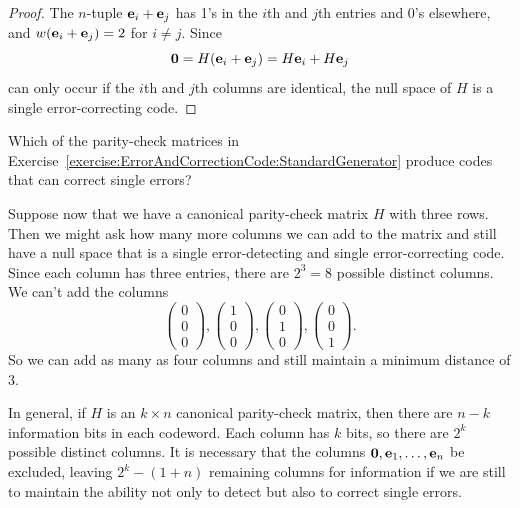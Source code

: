  
\begin{proof}
The $n$-tuple ${\bold e}_{i} +{\bold e}_{j}$ has 1's in the $i$th and
$j$th entries and 0's elsewhere, and $w( {\bold e}_{i} +{\bold
e}_{j}) = 2$ for $i \neq j$. Since
\[
{\bold 0}
= H({\bold e}_{i} +{\bold e}_{j})
= H{\bold e}_{i} + H{\bold e}_{j}
\]
can only occur if the $i$th and $j$th columns are identical, the
null space of $H$ is a single error-correcting code.
\end{proof}
 
 \begin{exercise}{}
 Which of the parity-check matrices in Exercise~\ref{exercise:ErrorAndCorrectionCode:StandardGenerator} produce codes that can correct single errors?
 \end{exercise}
 
Suppose now that we have a canonical parity-check matrix $H$ with
three rows. Then we might ask how many more columns we can add to
the matrix and still have a null space that is a single
error-detecting and single error-correcting code. Since each column
has three entries, there are $2^3 = 8$ possible distinct columns. We
can't add the columns 
\[
\left(
\begin{array}{c} 0 \\ 0 \\ 0 \end{array}
\right),
\left(
\begin{array}{c} 1 \\ 0 \\ 0 \end{array}
\right),
\left(
\begin{array}{c} 0 \\ 1 \\ 0 \end{array}
\right),
\left(
\begin{array}{c} 0 \\ 0 \\ 1 \end{array}
\right).
\]
So we can add as many as four columns and still maintain a minimum
distance of 3. 
 
 
In general, if $H$ is an $k \times n$ canonical parity-check matrix,
then there are $n-k$ information bits in each codeword. Each
column has $k$ bits, so there are $2^k$ possible distinct columns.
It is necessary that the columns ${\bold 0}, {\bold e}_1, \ldots,
{\bold e}_n$ be excluded, leaving $2^k - (1 + n)$ remaining columns for
information if we are still to maintain the ability not only to detect
but also to correct single errors. 
 
